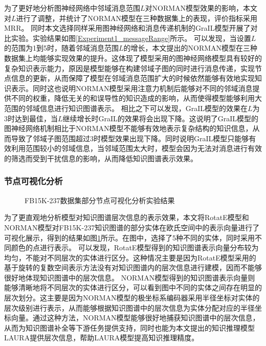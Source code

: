 \documentclass[algorithmlist, AutoFakeBold, AutoFakeSlant, figurelist, tablelist, nomlist, engineering, openany]{seuthesix} %
\begin{document}
为了更好地分析图神经网络中邻域消息范围$L$对NORMAN模型效果的影响，本文对$L$进行了调整，并统计了NORMAN模型在三种数据集上的表现，评价指标采用MRR。
同时本文选择同样采用图神经网络和消息传递机制的GraIL模型开展了对比实验。实验结果如图\ref{Experiment1_messageRange}所示。
可以发现，当设置$L$的范围为1到5时，随着邻域消息范围$L$的增长，本文提出的NORMAN模型在三种数据集上均能够实现效果的提升。这体现了模型采用的图神经网络模型具有较好的复杂知识表示能力，原因是模型能够在构建邻域子图的同时进行消息传递，实现节点信息的更新，从而保障了模型在邻域消息范围扩大的时候依然能够有效地实现知识表示。同时这也说明NORMAN模型采用注意力机制后能够对不同的邻域消息提供不同的权重，降低无关的和误导性的知识造成的影响，从而使得模型能够利用大范围的邻域信息进行知识图谱表示。
相比之下可以发现，GraIL模型的效果在$L$为3时达到最佳，当$L$继续增长时GraIL的效果将会出现下降。这说明了GraIL模型的图神经网络机制相比于NORMAN模型不能够有效地表示复杂结构的知识信息，从而导致了邻域子图范围超过3时模型效果出现下降。同时说明GraIL模型只能够有效利用范围较小的邻域信息，当邻域范围太大时，模型会因为无法对消息进行有效的筛选而受到干扰信息的影响，从而降低知识图谱表示效果。

\subsubsection{节点可视化分析}
\begin{figure}[t]
  \centering
  \caption{FB15K-237数据集部分节点可视化分析实验结果}
  \label{Experiment1_figures}
\end{figure}

为了更直观地分析模型对知识图谱层次信息的表示效果，本文将RotatE模型和NORMAN模型对FB15K-237知识图谱的部分实体在欧氏空间中的表示向量进行了可视化展示，得到的结果如图\ref{Experiment1_figures}所示。在图中，选择了5种不同的实体，同时采用不同颜色的点进行表示。
可以发现，RotatE模型得到的知识图谱表示向量分布较为均匀，不能对不同层次的实体进行区分。这种情况主要是因为RotatE模型采用的基于旋转的复数空间表示方法没有对知识图谱内的层次信息进行建模，因而不能够很好地体现知识图谱中的层次信息。
NORMAN模型得到的知识图谱表示向量则能够清晰地将不同层次的实体进行区分，可以看到图中不同的实体之间存在明显的层次划分。这主要是因为NORMAN模型的极坐标系编码器采用半径坐标对实体的层次级别进行表示，从而能够根据知识图谱中的层次信息为实体分配对应的半径坐标向量。通过这种方法，NORMAN模型能够很好地捕获知识图谱中的层次信息，从而为知识图谱补全等下游任务提供支持，同时也能为本文提出的知识推理模型LAURA提供层次信息，帮助LAURA模型提高知识推理精度。
\end{document}
